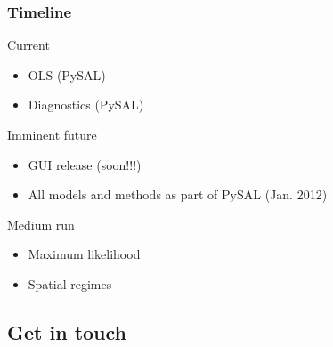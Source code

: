 \documentclass[nototal]{beamer}
\begin{document}
\begin{frame}
	\frametitle{Timeline}
 
\begin{block}{Current}
 \begin{itemize}
 \item  OLS (PySAL)
 \item  Diagnostics (PySAL)
 \end{itemize}
 \end{block} 
\begin{block}{Imminent future}
 \begin{itemize}
 \item  GUI release (soon!!!)
 \item  All models and methods as part of PySAL (Jan. 2012)
 \end{itemize}
 \end{block} 
\begin{block}{Medium run}
 \begin{itemize}
 \item  Maximum likelihood
 \item  Spatial regimes
 \end{itemize}
 \end{block} \end{frame} 

\subsection{Get in touch} 
\end{document}
